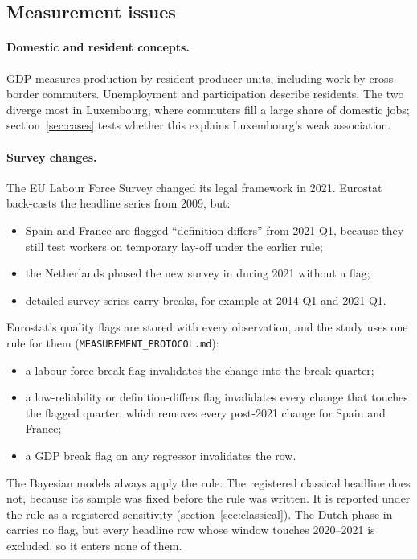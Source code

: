 \subsection{Measurement issues}

\paragraph{Domestic and resident concepts.} GDP measures production by resident
producer units, including work by cross-border commuters. Unemployment and participation
describe residents. The two diverge most in Luxembourg, where commuters fill a large share
of domestic jobs; section~\ref{sec:cases} tests whether this explains Luxembourg's weak
association.

\paragraph{Survey changes.} The EU Labour Force Survey changed its legal framework in 2021.
Eurostat back-casts the headline series from 2009, but:
\begin{itemize}
  \item Spain and France are flagged ``definition differs'' from 2021-Q1, because they still
    test workers on temporary lay-off under the earlier rule;
  \item the Netherlands phased the new survey in during 2021 without a flag;
  \item detailed survey series carry breaks, for example at 2014-Q1 and 2021-Q1.
\end{itemize}
Eurostat's quality flags are stored with every observation, and the study uses one rule
for them (\texttt{MEASUREMENT\_PROTOCOL.md}):
\begin{itemize}
  \item a labour-force break flag invalidates the change into the break quarter;
  \item a low-reliability or definition-differs flag invalidates every change that touches
    the flagged quarter, which removes every post-2021 change for Spain and France;
  \item a GDP break flag on any regressor invalidates the row.
\end{itemize}
The Bayesian models always apply the rule. The registered classical headline does not,
because its sample was fixed before the rule was written. It is reported under the rule as
a registered sensitivity (section~\ref{sec:classical}). The Dutch phase-in carries no
flag, but every headline row whose window touches 2020--2021 is excluded, so it enters
none of them.


